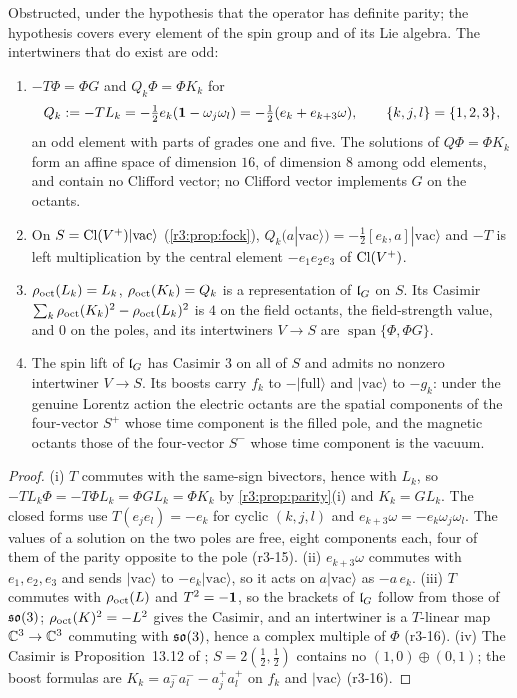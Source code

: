 Obstructed, under the hypothesis that the operator has definite parity; the hypothesis covers every element of the spin group and of its
Lie algebra. The intertwiners that do exist are odd:

\begin{proposition}
\label{r3:prop:odd}
\begin{enumerate}[label=(\roman*),leftmargin=2.2em]
\item $-T\Phi=\Phi G$ and $Q_k\Phi=\Phi K_k$ for
\[
Q_k:=-TL_k=-\tfrac12e_k(\mathbf 1-\omega_j\omega_l)=-\tfrac12(e_k+e_{k+3}\omega),\qquad\{k,j,l\}=\{1,2,3\},
\]
an odd element with parts of grades one and five. The solutions of $Q\Phi=\Phi K_k$ form an affine space of dimension $16$, of dimension $8$
among odd elements, and contain no Clifford vector; no Clifford vector implements $G$ on the octants.
\item On $S=\mathrm{Cl}(V^+)|\mathrm{vac}\rangle$ (\cref{r3:prop:fock}), $Q_k(a|\mathrm{vac}\rangle)=-\tfrac12[e_k,a]|\mathrm{vac}\rangle$ and $-T$ is left multiplication by the
central element $-e_1e_2e_3$ of $\mathrm{Cl}(V^+)$.
\item $\rho_{\rm oct}(L_k)=L_k$, $\rho_{\rm oct}(K_k)=Q_k$ is a representation of $\mathfrak l_G$ on $S$. Its Casimir $\sum_k\rho_{\rm oct}(K_k)^2-\rho_{\rm oct}(L_k)^2$
is $4$ on the field octants, the field-strength value, and $0$ on the poles, and its intertwiners $V\to S$ are $\operatorname{span}\{\Phi,\Phi G\}$.
\item The spin lift of $\mathfrak l_G$ has Casimir $3$ on all of $S$ and admits no nonzero intertwiner $V\to S$. Its boosts carry $f_k$ to $-|\mathrm{full}\rangle$
and $|\mathrm{vac}\rangle$ to $-g_k$: under the genuine Lorentz action the electric octants are the spatial components of the four-vector $S^+$
whose time component is the filled pole, and the magnetic octants those of the four-vector $S^-$ whose time component is the vacuum.
\end{enumerate}
\end{proposition}

\begin{proof}
(i) $T$ commutes with the same-sign bivectors, hence with $L_k$, so $-TL_k\Phi=-T\Phi L_k=\Phi GL_k=\Phi K_k$ by \cref{r3:prop:parity}(i) and $K_k=GL_k$.
The closed forms use $T(e_je_l)=-e_k$ for cyclic $(k,j,l)$ and $e_{k+3}\omega=-e_k\omega_j\omega_l$. The values of a solution on the two poles are free, eight
components each, four of them of the parity opposite to the pole (r3-15). (ii) $e_{k+3}\omega$ commutes with $e_1,e_2,e_3$ and sends $|\mathrm{vac}\rangle$ to $-e_k|\mathrm{vac}\rangle$,
so it acts on $a|\mathrm{vac}\rangle$ as $-a\,e_k$. (iii) $T$ commutes with $\rho_{\rm oct}(L)$ and $T^2=-\mathbf 1$, so the brackets of $\mathfrak l_G$ follow from
those of $\mathfrak{so}(3)$; $\rho_{\rm oct}(K)^2=-L^2$ gives the Casimir, and an intertwiner is a $T$-linear map $\mathbb{C}^3\to\mathbb{C}^3$ commuting with $\mathfrak{so}(3)$, hence a
complex multiple of $\Phi$ (r3-16). (iv) The Casimir is Proposition~13.12 of \cite{ES17}; $S=2(\tfrac12,\tfrac12)$ contains no
$(1,0)\oplus(0,1)$; the boost formulas are $K_k=a^-_ja^-_l-a^+_ja^+_l$ on $f_k$ and $|\mathrm{vac}\rangle$ (r3-16).
\end{proof}

